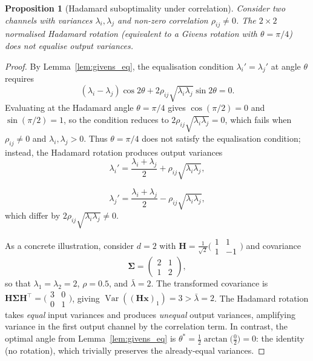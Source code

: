 \documentclass[11pt,a4paper]{article}
\newtheorem{proposition}[theorem]{Proposition}
\DeclareMathOperator{\Var}{Var}
\newcommand{\bx}{\mathbf{x}}
\newcommand{\bH}{\mathbf{H}}
\newcommand{\bSigma}{\boldsymbol{\Sigma}}
\begin{document}
\begin{proposition}[Hadamard suboptimality under correlation]
\label{prop:hadamard_subopt}
Consider two channels with variances $\lambda_i, \lambda_j$ and non-zero correlation $\rho_{ij} \neq 0$.
The $2 \times 2$ normalised Hadamard rotation (equivalent to a Givens rotation with $\theta = \pi/4$) does not equalise output variances.
\end{proposition}

\begin{proof}
By Lemma~\ref{lem:givens_eq}, the equalisation condition $\lambda_i' = \lambda_j'$ at angle $\theta$ requires
\[
(\lambda_i - \lambda_j)\cos 2\theta + 2\rho_{ij}\sqrt{\lambda_i\lambda_j}\sin 2\theta = 0.
\]
Evaluating at the Hadamard angle $\theta = \pi/4$ gives $\cos(\pi/2) = 0$ and $\sin(\pi/2) = 1$, so the condition reduces to $2\rho_{ij}\sqrt{\lambda_i\lambda_j} = 0$, which fails when $\rho_{ij} \neq 0$ and $\lambda_i, \lambda_j > 0$.
Thus $\theta = \pi/4$ does not satisfy the equalisation condition; instead, the Hadamard rotation produces output variances
\[
\lambda_i' = \frac{\lambda_i + \lambda_j}{2} + \rho_{ij}\sqrt{\lambda_i\lambda_j},
\]

\[
\lambda_j' = \frac{\lambda_i + \lambda_j}{2} - \rho_{ij}\sqrt{\lambda_i\lambda_j},
\]
which differ by $2\rho_{ij}\sqrt{\lambda_i\lambda_j} \neq 0$.

As a concrete illustration, consider $d = 2$ with $\bH = \frac{1}{\sqrt{2}}\bigl(\begin{smallmatrix} 1 & 1 \\ 1 & -1 \end{smallmatrix}\bigr)$ and covariance
\[
\bSigma = \begin{pmatrix} 2 & 1 \\ 1 & 2 \end{pmatrix},
\]
so that $\lambda_1 = \lambda_2 = 2$, $\rho = 0.5$, and $\bar{\lambda} = 2$.
The transformed covariance is $\bH \bSigma \bH^\top = \bigl(\begin{smallmatrix} 3 & 0 \\ 0 & 1 \end{smallmatrix}\bigr)$, giving $\Var((\bH\bx)_1) = 3 > \bar{\lambda} = 2$.
The Hadamard rotation takes \emph{equal} input variances and produces \emph{unequal} output variances, amplifying variance in the first output channel by the correlation term.
In contrast, the optimal angle from Lemma~\ref{lem:givens_eq} is $\theta^* = \frac{1}{2}\arctan\bigl(\frac{0}{2}\bigr) = 0$: the identity (no rotation), which trivially preserves the already-equal variances.
\end{proof}
\end{document}
